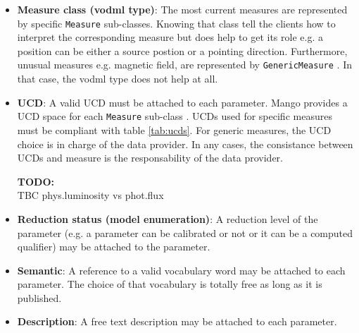 \documentclass[11pt,a4paper]{ivoa}
\newcommand{\TODO}[1]{%
    \noindent%
    \colorbox{todocolor}{%
            \parbox{0.85\linewidth}{\sffamily \textbf{TODO:}\\
            #1}
    }%
    \vspace{2pt}

}
\begin{document}
\begin{itemize}
    \item \textbf{Measure class (vodml type)}: The most current measures are represented by specific  \texttt{Measure} sub-classes. Knowing that class tell the clients  how to interpret the corresponding measure but does help to get its role e.g. a position can be either a source postion or a pointing direction. Furthermore, unusual measures e.g. magnetic field,  are represented by  \texttt{GenericMeasure} . In that case, the vodml type does not help at all.
    \item \textbf{UCD}: A valid UCD must be attached to each parameter. Mango provides a UCD space for each \texttt{Measure} sub-class . UCDs used for specific measures must be compliant with table \ref{tab:ucds}. For generic measures, the UCD choice is in charge of the data provider. In any cases, the consistance between UCDs and measure is the responsability of the data provider.
\TODO{TBC phys.luminosity  vs phot.flux}
    \item \textbf{Reduction status (model enumeration)}: A reduction level of the parameter (e.g. a parameter can be calibrated or not or it can be a computed qualifier) may be attached to the parameter.
    \item \textbf{Semantic}: A reference to  a valid vocabulary word may be attached to each parameter. The choice of that vocabulary is totally free as long as it is published.
    \item \textbf{Description}: A free text description may be attached to each parameter.
 \end{itemize}
\end{document}
